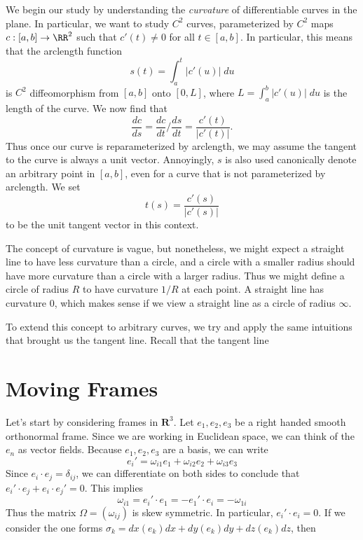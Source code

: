 We begin our study by understanding the \emph{curvature} of differentiable curves in the plane. In particular, we want to study $C^2$ curves, parameterized by $C^2$ maps $c: [a,b] \to \RR^2$ such that $c'(t) \neq 0$ for all $t \in [a,b]$. In particular, this means that the arclength function
%
\[ s(t) = \int_a^t |c'(u)|\; du \]
%
is $C^2$ diffeomorphism from $[a,b]$ onto $[0,L]$, where $L = \int_a^b |c'(u)|\; du$ is the length of the curve. We now find that
%
\[ \frac{dc}{ds} = \frac{dc}{dt} \bigg/ \frac{ds}{dt} = \frac{c'(t)}{|c'(t)|}. \]
%
Thus once our curve is reparameterized by arclength, we may assume the tangent to the curve is always a unit vector. Annoyingly, $s$ is also used canonically denote an arbitrary point in $[a,b]$, even for a curve that is not parameterized by arclength. We set
%
\[ t(s) = \frac{c'(s)}{|c'(s)|} \]
%
to be the unit tangent vector in this context.

The concept of curvature is vague, but nonetheless, we might expect a straight line to have less curvature than a circle, and a circle with a smaller radius should have more curvature than a circle with a larger radius. Thus we might define a circle of radius $R$ to have curvature $1/R$ at each point. A straight line has curvature $0$, which makes sense if we view a straight line as a circle of radius $\infty$.

To extend this concept to arbitrary curves, we try and apply the same intuitions that brought us the tangent line. Recall that the tangent line 




\chapter{Moving Frames}

Let's start by considering frames in $\mathbf{R}^3$. Let $e_1, e_2, e_3$ be a right handed smooth orthonormal frame. Since we are working in Euclidean space, we can think of the $e_n$ as vector fields. Because $e_1, e_2, e_3$ are a basis, we can write
%
\[ e_i' = \omega_{i1} e_1 + \omega_{i2} e_2 + \omega_{i3} e_3 \]
%
Since $e_i \cdot e_j = \delta_{ij}$, we can differentiate on both sides to conclude that $e_i' \cdot e_j + e_i \cdot e_j' = 0$. This implies
%
\[ \omega_{i1} = e_i' \cdot e_1 = - e_1' \cdot e_i = - \omega_{1i} \]
%
Thus the matrix $\Omega = (\omega_{ij})$ is skew symmetric. In particular, $e_i' \cdot e_i = 0$. If we consider the one forms $\sigma_k = dx(e_k) dx + dy(e_k) dy + dz(e_k) dz$, then









